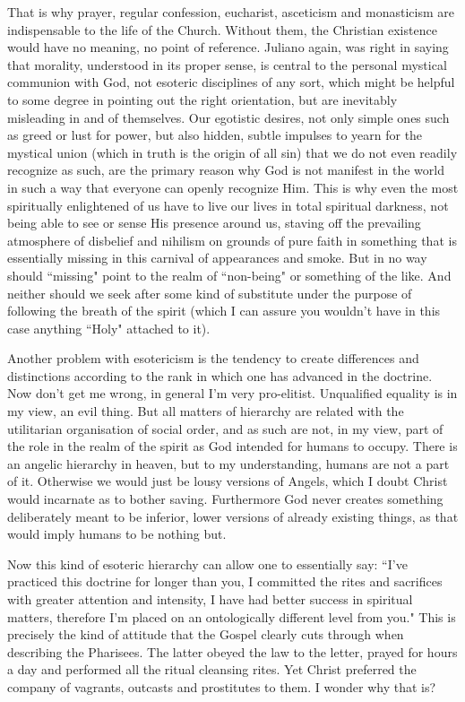 \begin{footnotesize}
\begin{sffamily}
That is why prayer, regular confession, eucharist, asceticism and monasticism are indispensable to the life of the Church. Without them, the Christian existence would have no meaning, no point of reference. Juliano again, was right in saying that morality, understood in its proper sense, is central to the personal mystical communion with God, not esoteric disciplines of any sort, which might be helpful to some degree in pointing out the right orientation, but are inevitably misleading in and of themselves. Our egotistic desires, not only simple ones such as greed or lust for power, but also hidden, subtle impulses to yearn for the mystical union (which in truth is the origin of all sin) that we do not even readily recognize as such, are the primary reason why God is not manifest in the world in such a way that everyone can openly recognize Him. This is why even the most spiritually enlightened of us have to live our lives in total spiritual darkness, not being able to see or sense His presence around us, staving off the prevailing atmosphere of disbelief and nihilism on grounds of pure faith in something that is essentially missing in this carnival of appearances and smoke. But in no way should ``missing" point to the realm of ``non-being" or something of the like. And neither should we seek after some kind of substitute under the purpose of following the breath of the spirit (which I can assure you wouldn't have in this case anything ``Holy" attached to it). 

Another problem with esotericism is the tendency to create differences and distinctions according to the rank in which one has advanced in the doctrine. Now don't get me wrong, in general I'm very pro-elitist. Unqualified equality is in my view, an evil thing. But all matters of hierarchy are related with the utilitarian organisation of social order, and as such are not, in my view, part of the role in the realm of the spirit as God intended for humans to occupy. There is an angelic hierarchy in heaven, but to my understanding, humans are not a part of it. Otherwise we would just be lousy versions of Angels, which I doubt Christ would incarnate as to bother saving. Furthermore God never creates something deliberately meant to be inferior, lower versions of already existing things, as that would imply humans to be nothing but. 

Now this kind of esoteric hierarchy can allow one to essentially say: ``I've practiced this doctrine for longer than you, I committed the rites and sacrifices with greater attention and intensity, I have had better success in spiritual matters, therefore I'm placed on an ontologically different level from you." This is precisely the kind of attitude that the Gospel clearly cuts through when describing the Pharisees. The latter obeyed the law to the letter, prayed for hours a day and performed all the ritual cleansing rites. Yet Christ preferred the company of vagrants, outcasts and prostitutes to them. I wonder why that is? 


\end{sffamily}
\end{footnotesize}
